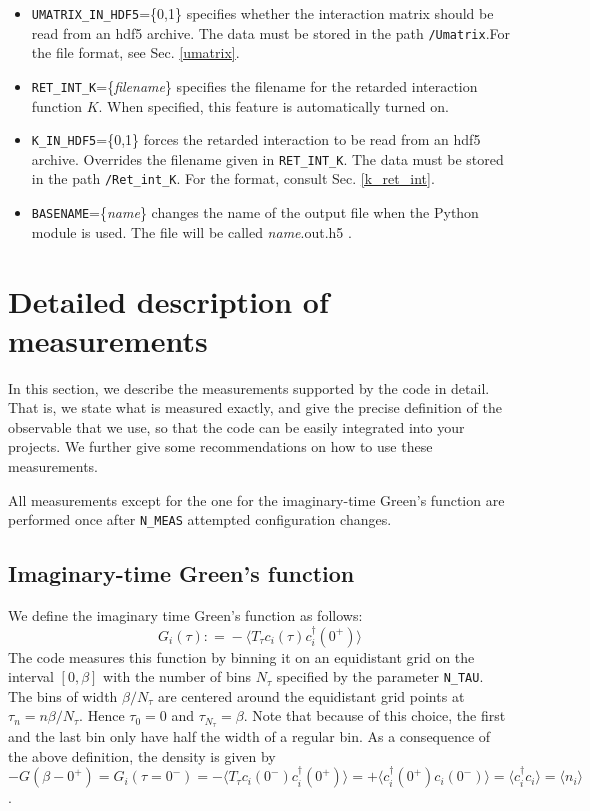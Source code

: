 \documentclass[aps,prb,floatfix,superscriptaddress,twocolumn,notitlepage]{revtex4-1}
\newcommand\Let{\mathrel{\mathop:\!\!=}}
\begin{document}
\begin{itemize}
\item\verb#UMATRIX_IN_HDF5#=\{0,1\} specifies whether the interaction matrix should be read from an hdf5 archive. The data must be stored in the path \verb#/Umatrix#.For the file format, see Sec. \ref{umatrix}.

\item \verb#RET_INT_K#=\{\emph{filename}\} specifies the filename for the retarded interaction function $K$. When specified, this feature is automatically turned on.

\item \verb#K_IN_HDF5#=\{0,1\} forces the retarded interaction to be read from an hdf5 archive. Overrides the filename given in \verb#RET_INT_K#.  The data must be stored in the path \verb#/Ret_int_K#. For the format, consult Sec. \ref{k_ret_int}.

\item \verb#BASENAME#=\{\emph{name}\} changes the name of the output file when the Python module is used. The file will be called \emph{name}.out.h5 .

\end{itemize}

\section{Detailed description of measurements}
\label{measurements}
In this section, we describe the measurements supported by the code in detail. That is, we state what is measured exactly, and give the precise definition of the observable that we use, so that the code can be easily integrated into your projects. We further give some recommendations on how to use these measurements.	

All measurements except for the one for the imaginary-time Green's function are performed once after \verb#N_MEAS# attempted configuration changes.

\subsection{Imaginary-time Green's function}
\label{gtmeas}

We define the imaginary time Green's function as follows:
\begin{equation}
G_{i}(\tau) \Let -\langle T_{\tau}c_{i}(\tau)c_{i}^{\dagger}(0^{+})\rangle
\label{Gtdef}
\end{equation}
The code measures this function by binning it on an equidistant grid on the interval $[0,\beta]$ with the number of bins $N_{\tau}$ specified by the parameter \verb#N_TAU#.
The bins of width $\beta/N_{\tau}$ are centered around the equidistant grid points at $\tau_{n}=n\beta/N_{\tau}$. Hence $\tau_{0}=0$ and $\tau_{N_{\tau}}=\beta$. Note that because of this choice, the first and the last bin only have half the width of a regular bin.
As a consequence of the above definition, the density is given by
$-G(\beta-0^{+})=G_{i}(\tau=0^{-})=-\langle T_{\tau} c_{i}(0^{-})c_{i}^{\dagger}(0^{+})\rangle = +\langle c_{i}^{\dagger}(0^{+}) c_{i}(0^{-})\rangle =\langle c_{i}^{\dagger} c_{i}\rangle = \langle n_{i} \rangle$.
\end{document}
